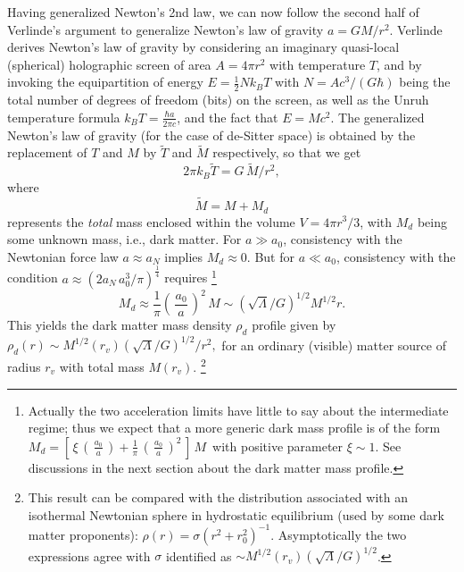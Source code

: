 \documentclass[a4paper]{jpconf}
\begin{document}
Having generalized Newton's 2nd law, we \cite{HMN}
can now follow the second half of Verlinde's argument \cite{verlinde} to 
generalize Newton's law of gravity
$a= G M /r^2$.  Verlinde derives Newton's law of gravity by considering an
imaginary quasi-local (spherical) holographic screen of area $A=4 \pi
r^2$ with temperature $T$, and by invoking the equipartition of energy $E= 
\frac{1}{2} N k_B T$
with $N = Ac^3/(G \hbar)$ being the total number of degrees of freedom (bits) on 
the screen, as well as the Unruh
temperature formula  $k_B T = \frac{\hbar a}{2 \pi c}$,
and the fact that $E= M c^2$.  The generalized Newton's
law of gravity (for the case of de-Sitter space) is obtained by the 
replacement of $T$ and $M$ by $\tilde{T}$ and $\tilde{M}$ respectively, so 
that we get 
\begin{equation}
2 \pi k_B \tilde{T} = G\,\tilde{M} /r^2,
\end{equation}
where 
\begin{equation}
\tilde{M} = M + M_d 
\end{equation}
represents the \emph{total} mass enclosed within the 
volume $V = 4 \pi r^3 / 3$, with
$M_d$ being some unknown mass, i.e., dark
matter.  For $a \gg a_0$, consistency with the Newtonian force law $a \approx 
a_N$ implies $M_d \approx 0$.  But
for $a \ll a_0$, consistency with the condition 
$a \approx \left(2 a_N \,a_0^3 /\pi \right)^{\frac14}$ 
requires \footnote{Actually the two acceleration limits have little to 
say about the intermediate regime; thus we expect that a more generic 
dark mass profile is of the form 
$
M_d = \left[\,\xi\,\left(\,\frac{a_0}{a}\,\right)+\frac{1}{\pi}\,
\left(\,\frac{a_0}{a}\,\right)^2\,\right] \, M\,
$  
with positive parameter $\xi \sim 1$.  See discussions in the next section
about the dark matter mass profile.}
\begin{equation}
M_d \approx \frac{1}{\pi} \left(\,\frac{a_0}{a}\,\right)^2\, M
\sim (\sqrt{\Lambda}/G)^{1/2}M^{1/2}r.  
\label{darkmatt}
\end{equation}
This yields
the dark matter mass density $\rho_d$ profile given by
$
\rho_d(r) \sim M^{1/2}(r_v) (\sqrt{\Lambda}/G)^{1/2} / r^2,
$ for an ordinary (visible) matter source of radius $r_v$ with
total mass $M(r_v)$. \footnote{
This result can be compared with the distribution associated with
an isothermal Newtonian sphere in hydrostatic equilibrium (used by some dark 
matter proponents):
$
\rho (r) = \sigma (r^2 + r_0^2)^{-1}.
$
Asymptotically the two expressions agree with
$\sigma$ identified as $\sim M^{1/2}(r_v) (\sqrt{\Lambda}
/G)^{1/2} $. }\\
\end{document}
